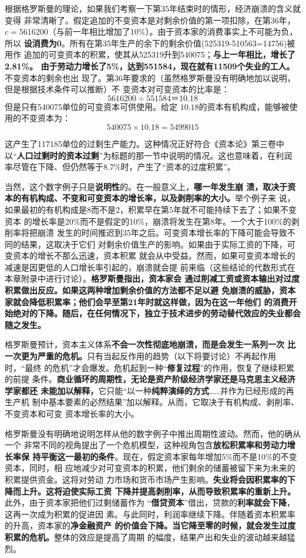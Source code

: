 根据格罗斯曼的理论，如果我们考察一下第35年结束时的情形，经济崩溃的含义就变得
非常清晰了。假定追加的不变资本是对剩余价值的第一项扣除，在第36年，
$c=5616200$（与前一年相比增加了10\%）。由于资本家的消费事实上不可能为负，所以
\textbf{设消费为0}。所有在第35年生产的余下的剩余价值(525319-510563=14756)被用作
追加的可变资本的积累，使其从525319升到540075；\textbf{与上一年相比，增长了2.81\%。
由于劳动力增长了5\%，达到551584，现在就有11509个失业的工人。}不变资本的剩余也出
现了。第36年要求的（虽然格罗斯曼没有明确地加以说明，但是根据技术条件可以推断）不
变资本对可变资本的比率是：
\[ 5616200 \div 551584＝10.18 \]但是只有540075单位的可变资本可供使用。给定
$10.18$的资本有机构成，能够被使用的不变资本为：
\[ 540075 \times 10.18= 5499015 \]

这产生了117185单位的过剩生产能力。这种情况正好符合《资本论》第三卷中
以“\textbf{人口过剩时的资本过剩}”为标题的那一节中说明的情况。这也意味着，在利润
率尽管在下降、但仍然等于8.7\%时，产生了“资本的过度积累”。

当然，这个数字例子只是\textbf{说明性}的。在一般意义上，\textbf{哪一年发生崩
溃，取决于资本的有机构成、不变和可变资本的增长率，以及剥削率的大小。}举个例子来
说，如果最初的有机构成是8而不是2，积累早在第5年就不可能持续下去了；如果不变资本
的增长率是20\%而不是假定的10\%，崩溃将发生在第8年。一个大于100\%的剥削率将把崩溃
发生的时间推迟到35年之后。可变资本增长率的下降可能会导致不同的结果，这取决于它们
对剩余价值生产的影响。如果由于实际工资的下降，可变资本的增长不那么迅速，资本积累
就会从中受益。然而，如果可变资本增长的减速是因更低的人口增长率引起的，崩溃就会提
前来临（这些结论的代数形式在本章附录中进行讨论）。\textbf{格罗斯曼指出，资本家会
通过削减工资或资本输出对过度积累做出反应。如果这两种增加剩余价值的方法都不足以避
免崩溃的威胁，资本家就会降低积累率；他们会早至第21年时就这样做，因为在这一年他们
的消费开始绝对的下降。随后，在任何情况下，独立于技术进步的劳动替代效应的失业都会
随之发生。}

格罗斯曼预计，资本主义体系\textbf{不会一次性彻底地崩溃，而是会发生一系列一次
比一次更为严重的危机。}只有当起反作用的趋势（以下将要讨论）不再起作用时，“最终
的危机”才会爆发。危机起到一种“\textbf{修复过程}”的作用，恢复了继续积累的前提
条件。\textbf{商业循环的周期性，无论是资产阶级经济学家还是马克思主义经济学家都还
未能加以解释，}它只能“以一种\textbf{纯粹演绎的方式}……并作为已经形成的再生产机
制中基本要素的必然结果”加以解释。从而，它取决于有机构成、剥削率、不变资本和可变
资本增长率的大小。

格罗斯曼没有明确地说明怎样从他的数字例子中推出周期性波动。然而，他的确从一个
非常不同的视角提出了一个危机模型，这种视角包含\textbf{放松积累率和劳动力增长率保
持平衡这一最初的条件}。现在，假定资本家每年增加5\%而不是10\%的不变资本，同时，相
应地减少对可变资本的积累，他们剩余的储蓄被留下来为未来的积累提供资金。这将对劳动
力市场和货币市场产生影响。\textbf{失业将会因积累率的下降而上升。这将迫使实际工资
下降并提高剥削率，从而导致积累率的重新上升。}此外，由于资本家把他们过剩储蓄作为
“\textbf{借贷资本}”借出，贷款的\textbf{利率就会下降}，这再一次成为积累的促进因
素。与此同时，利润率继续下降。伴随着资本积累率的升高，资本家的\textbf{净金融资产
的价值会下降。当它降至零的时候，就会发生过度积累的危机。}整体的效应是提高了周期
的幅度，结果产出和失业的波动越来越猛烈。

